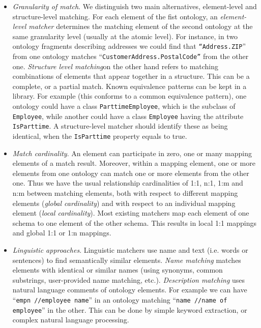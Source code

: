 \begin{itemize}
\item \textit{Granularity of match}. We distinguish two main
alternatives, element-level and structure-level matching. For each
element of the fist ontology, an \textit{element-level matcher}
determines the matching element of the second ontology at the same
granularity level (usually at the atomic level). For instance, in two
ontology fragments describing addresses we could find that
\texttt{{\textquotedblleft}Address.ZIP}{\textquotedblright}
from one ontology matches
{\textquotedblleft}\texttt{CustomerAddress.PostalCode{\textquotedblright}}
from the other one. \textit{Structure level matching}on the other hand
refers to matching combinations of elements that appear together in a
structure. This can be a complete, or a partial match. Known
equivalence patterns can be kept in a library. For example (this
conforms to a common equivalence pattern), one ontology could have a
class \texttt{ParttimeEmployee}, which is the subclass of
\texttt{Employee}, while another could have a class
\texttt{Employee} having the attribute
\texttt{IsParttime}. A structure-level matcher should
identify these as being identical, when the
\texttt{IsParttime} property equals to true. 
\end{itemize}
\begin{itemize}
\item \textit{Match cardinality}. An element can participate in zero,
one or many mapping elements of a match result. Moreover, within a
mapping element, one or more elements from one ontology can match one
or more elements from the other one. Thus we have the usual
relationship cardinalities of 1:1, n:1, 1:m and n:m between matching
elements, both with respect to different mapping elements
(\textit{global cardinality}) and with respect to an individual mapping
element (\textit{local cardinality}).\newline
Most existing matchers map each element of one schema to one element of
the other schema. This results in local 1:1 mappings and global 1:1 or
1:n mappings. 
\end{itemize}
\begin{itemize}
\item \textit{Linguistic approaches}. Linguistic matchers use name and
text (i.e. words or sentences) to find semantically similar elements.
\textit{Name matching} matches elements with identical or similar names
(using synonyms, common substrings, user-provided name matching, etc.).
\textit{Description matching} uses natural language comments of
ontology elements. For example we can have
{\textquotedblleft}\texttt{empn //employee
name}{\textquotedblright} in an ontology matching
{\textquotedblleft}\texttt{name //name of
employee}{\textquotedblright} in the other. This can be done by simple
keyword extraction, or complex natural language processing. 
\end{itemize}
